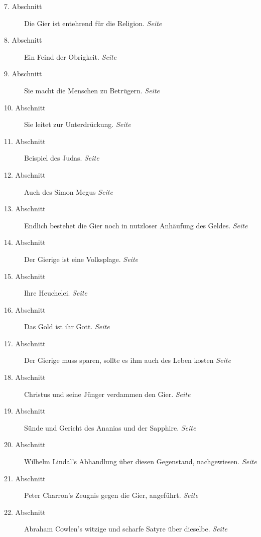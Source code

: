 \begin{description}
\item[7. Abschnitt] Die Gier ist entehrend für die Religion.
\dotfill \textit{Seite \pageref{kap13_ab7}}\\
\item[8. Abschnitt] Ein Feind der Obrigkeit.
\dotfill \textit{Seite \pageref{kap13_ab8}}\\
\item[9. Abschnitt] Sie macht die Menschen zu Betrügern.
\dotfill \textit{Seite \pageref{kap13_ab9}}\\
\item[10. Abschnitt] Sie leitet zur Unterdrückung.
\dotfill \textit{Seite \pageref{kap13_ab10}}\\
\item[11. Abschnitt] Beispiel des Judas.
\dotfill \textit{Seite \pageref{kap13_ab11}}\\
\item[12. Abschnitt] Auch des Simon Megus
\dotfill \textit{Seite \pageref{kap13_ab12}}\\
\item[13. Abschnitt] Endlich bestehet die Gier noch in nutzloser Anhäufung des
Geldes.
\dotfill \textit{Seite \pageref{kap13_ab13}}\\
\item[14. Abschnitt] Der Gierige ist eine Volksplage.
\dotfill \textit{Seite \pageref{kap13_ab14}}\\
\item[15. Abschnitt] Ihre Heuchelei.
\dotfill \textit{Seite \pageref{kap13_ab15}}\\
\item[16. Abschnitt] Das Gold ist ihr Gott.
\dotfill \textit{Seite \pageref{kap13_ab16}}\\
\item[17. Abschnitt] Der Gierige muss sparen, sollte es ihm auch des Leben
kosten
\dotfill \textit{Seite \pageref{kap13_ab17}}\\
\item[18. Abschnitt] Christus und seine Jünger verdammen den Gier.
\dotfill \textit{Seite \pageref{kap13_ab18}}\\
\item[19. Abschnitt] Sünde und Gericht des Ananias und der Sapphire.
\dotfill \textit{Seite \pageref{kap13_ab19}}\\
\item[20. Abschnitt] Wilhelm Lindal's Abhandlung über diesen Gegenstand,
nachgewiesen.
\dotfill \textit{Seite \pageref{kap13_ab20}}\\
\item[21. Abschnitt] Peter Charron's Zeugnis gegen die Gier, angeführt.
\dotfill \textit{Seite \pageref{kap13_ab21}}\\
\item[22. Abschnitt] Abraham Cowlen's witzige und scharfe Satyre über dieselbe.
\dotfill \textit{Seite \pageref{kap13_ab22}}\\

\end{description}

